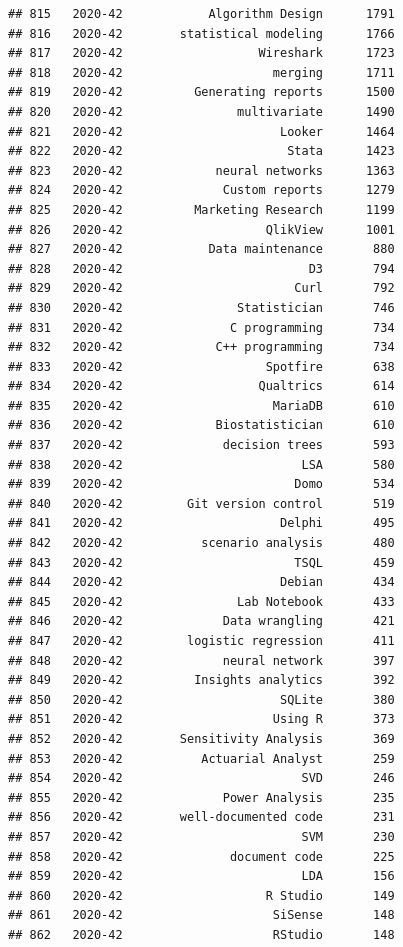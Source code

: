 \documentclass[
]{article}
\begin{document}
\begin{verbatim}
## 815   2020-42            Algorithm Design      1791
## 816   2020-42        statistical modeling      1766
## 817   2020-42                   Wireshark      1723
## 818   2020-42                     merging      1711
## 819   2020-42          Generating reports      1500
## 820   2020-42                multivariate      1490
## 821   2020-42                      Looker      1464
## 822   2020-42                       Stata      1423
## 823   2020-42             neural networks      1363
## 824   2020-42              Custom reports      1279
## 825   2020-42          Marketing Research      1199
## 826   2020-42                    QlikView      1001
## 827   2020-42            Data maintenance       880
## 828   2020-42                          D3       794
## 829   2020-42                        Curl       792
## 830   2020-42                Statistician       746
## 831   2020-42               C programming       734
## 832   2020-42             C++ programming       734
## 833   2020-42                    Spotfire       638
## 834   2020-42                   Qualtrics       614
## 835   2020-42                     MariaDB       610
## 836   2020-42             Biostatistician       610
## 837   2020-42              decision trees       593
## 838   2020-42                         LSA       580
## 839   2020-42                        Domo       534
## 840   2020-42         Git version control       519
## 841   2020-42                      Delphi       495
## 842   2020-42           scenario analysis       480
## 843   2020-42                        TSQL       459
## 844   2020-42                      Debian       434
## 845   2020-42                Lab Notebook       433
## 846   2020-42              Data wrangling       421
## 847   2020-42         logistic regression       411
## 848   2020-42              neural network       397
## 849   2020-42          Insights analytics       392
## 850   2020-42                      SQLite       380
## 851   2020-42                     Using R       373
## 852   2020-42        Sensitivity Analysis       369
## 853   2020-42           Actuarial Analyst       259
## 854   2020-42                         SVD       246
## 855   2020-42              Power Analysis       235
## 856   2020-42        well-documented code       231
## 857   2020-42                         SVM       230
## 858   2020-42               document code       225
## 859   2020-42                         LDA       156
## 860   2020-42                    R Studio       149
## 861   2020-42                     SiSense       148
## 862   2020-42                     RStudio       148

\end{verbatim}
\end{document}
